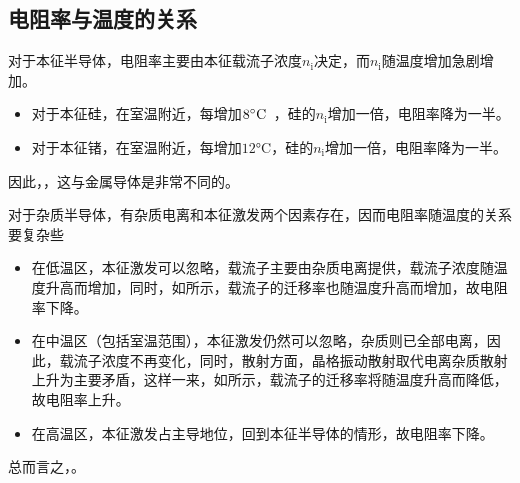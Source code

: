 \subsection{电阻率与温度的关系}
对于本征半导体，电阻率主要由本征载流子浓度$n_\text{i}$决定，而$n_\text{i}$随温度增加急剧增加。

\begin{itemize}
    \item 对于本征硅，在室温附近，每增加$8\si{\degreeCelsius}\hphantom{1}$，硅的$n_\text{i}$增加一倍，电阻率降为一半。
    \item 对于本征锗，在室温附近，每增加$12\si{\degreeCelsius}$，硅的$n_\text{i}$增加一倍，电阻率降为一半。
\end{itemize}
因此，，这与金属导体是非常不同的。

对于杂质半导体，有杂质电离和本征激发两个因素存在，因而电阻率随温度的关系要复杂些
\begin{itemize}
    \item 在低温区，本征激发可以忽略，载流子主要由杂质电离提供，载流子浓度随温度升高而增加，同时，如所示，载流子的迁移率也随温度升高而增加，故电阻率下降。
    \item 在中温区（包括室温范围），本征激发仍然可以忽略，杂质则已全部电离，因此，载流子浓度不再变化，同时，散射方面，晶格振动散射取代电离杂质散射上升为主要矛盾，这样一来，如所示，载流子的迁移率将随温度升高而降低，故电阻率上升。
    \item 在高温区，本征激发占主导地位，回到本征半导体的情形，故电阻率下降。
\end{itemize}

总而言之，。
